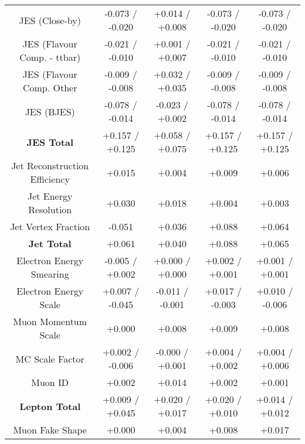 \begin{table}[htbp]
\begin{center}
\begin{tabular}{|c|c|c|c|c|}
JES (Close-by)                        &-0.073   / -0.020   & +0.014   / +0.008   & -0.073   / -0.020   & -0.073   / -0.020  \\
JES (Flavour Comp. - ttbar)           &-0.021   / -0.010   & +0.001   / +0.007   & -0.021   / -0.010   & -0.021   / -0.010  \\
JES (Flavour Comp. Other              &-0.009   / -0.008   & +0.032   / +0.035   & -0.009   / -0.008   & -0.009   / -0.008  \\
JES (BJES)                            &-0.078   / -0.014   & -0.023   / +0.002   & -0.078   / -0.014   & -0.078   / -0.014  \\
\hline
\textbf{JES Total}                    &+0.157   / +0.125   & +0.058   / +0.075   & +0.157   / +0.125   & +0.157   / +0.125  \\
\hline
Jet Reconstruction Efficiency         &+0.015              & +0.004              & +0.009              & +0.006             \\
Jet Energy Resolution                 &+0.030              & +0.018              & +0.004              & +0.003             \\
Jet Vertex Fraction                   &-0.051              & +0.036              & +0.088              & +0.064             \\
\hline
\textbf{Jet Total}                    &+0.061              & +0.040              & +0.088              & +0.065             \\
\hline
Electron Energy Smearing              &-0.005   / +0.002   & +0.000   / +0.000   & +0.002   / +0.001   & +0.001   / +0.001  \\
Electron Energy Scale                 &+0.007   / -0.045   & -0.011   / -0.001   & +0.017   / -0.003   & +0.010   / -0.006  \\
Muon Momentum Scale                   &+0.000              & +0.008              & +0.009              & +0.008             \\
MC Scale Factor                       &+0.002   / -0.006   & -0.000   / +0.001   & +0.004   / +0.002   & +0.004   / +0.006  \\
Muon ID                               &+0.002              & +0.014              & +0.002              & +0.001             \\
\hline
\textbf{Lepton Total}                 &+0.009   / +0.045   & +0.020   / +0.017   & +0.020   / +0.010   & +0.014   / +0.012  \\
\hline
Muon Fake Shape                       &+0.000              & +0.004              & +0.008              & +0.017             \\

\end{tabular}
\end{center}
\end{table}
